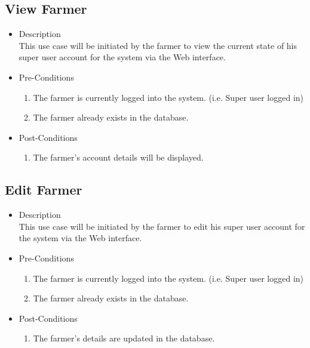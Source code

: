 \documentclass[11pt,fleqn]{book} %
\begin{document}
	\subsection{View Farmer}
	\begin{itemize}
		\item Description\\
		This use case will be initiated by the farmer to view the current state of his super user account for the system via the Web interface.
		\item Pre-Conditions
		\begin{enumerate}
			\item The farmer is currently logged into the system. (i.e. Super user logged in)
			\item The farmer already exists in the database.					
		\end{enumerate}
		\item Post-Conditions
		\begin{enumerate}
			\item The farmer’s account details will be displayed.
		\end{enumerate}
	\end{itemize}
	
	\subsection{Edit Farmer}
	\begin{itemize}
		\item Description\\
		This use case will be initiated by the farmer to edit his super user account for the system via the Web interface.
		\item Pre-Conditions
		\begin{enumerate}
			\item The farmer is currently logged into the system. (i.e. Super user logged in)
			\item The farmer already exists in the database.					
		\end{enumerate}
		\item Post-Conditions
		\begin{enumerate}
			\item The farmer’s details are updated in the database.
		\end{enumerate}
	\end{itemize}
	
\end{document}

